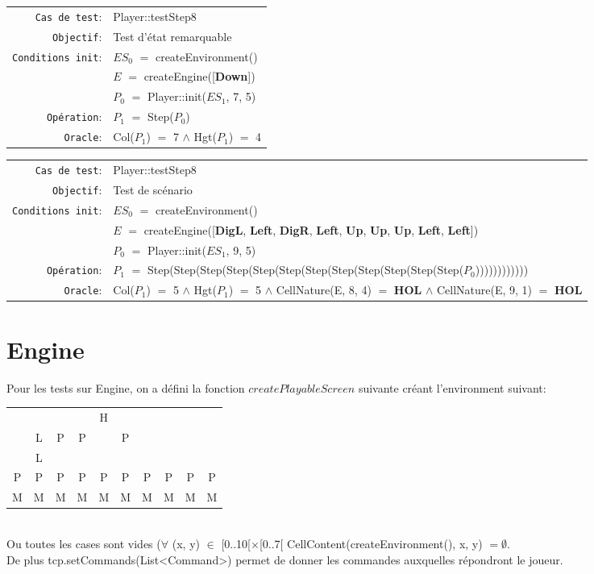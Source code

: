 \documentclass{article}
\begin{document}
{\small
  \begin{longtable}{rl}
    \texttt{Cas de test}: &\textrm{Player::testStep8}\\
    \texttt{Objectif}: & Test d'état remarquable \\
    \texttt{Conditions init}: & $ES_0$ $=$ \textrm{createEnvironment()}\\
    & $E$ $=$ \textrm{createEngine([\textbf{Down}])}\\
    & $P_0$ $=$ \textrm{Player::init($ES_1$, 7, 5)}\\
    \texttt{Opération}: &$P_1$ $=$ \textrm{Step($P_0$)}\\
    \texttt{Oracle}: &\textrm{Col($P_1$)} $=$ 7 $\land$ \textrm{Hgt($P_1$)} $=$ 4\\
  \end{longtable}}

{\small
  \begin{longtable}{rl}
    \texttt{Cas de test}: &\textrm{Player::testStep8}\\
    \texttt{Objectif}: & Test de scénario\\
    \texttt{Conditions init}: & $ES_0$ $=$ \textrm{createEnvironment()}\\
    & $E$ $=$ \textrm{createEngine([\textbf{DigL}, \textbf{Left}, \textbf{DigR}, \textbf{Left}, \textbf{Up}, \textbf{Up}, \textbf{Up}, \textbf{Left}, \textbf{Left}])}\\
    & $P_0$ $=$ \textrm{Player::init($ES_1$, 9, 5)}\\
    \texttt{Opération}: &$P_1$ $=$ \textrm{Step(Step(Step(Step(Step(Step(Step(Step(Step(Step(Step(Step($P_0$))))))))))))}\\
    \texttt{Oracle}: &\textrm{Col($P_1$)} $=$ 5 $\land$ \textrm{Hgt($P_1$)} $=$ 5 $\land$ \textrm{CellNature(E, 8, 4)} $=$ \textbf{HOL} $\land$ \textrm{CellNature(E, 9, 1)} $=$ \textbf{HOL}\\
  \end{longtable}}

\section{Engine}

Pour les tests sur Engine, on a défini la fonction $createPlayableScreen$ suivante créant l'environment suivant:\\
\begin{tabular}{cccccccccc}
   & & & &H& & & & & \\
   &L&P&P& &P& & & & \\
   &L& & & & & & & & \\
  P&P&P&P&P&P&P&P&P&P\\
  M&M&M&M&M&M&M&M&M&M
\end{tabular}\\
\noindent Ou toutes les cases sont vides ($\forall$ (x, y) $\in$ [0..10[$\times$[0..7[ \textrm{CellContent(createEnvironment(), x, y)} $= \emptyset$.\\
De plus \textrm{tcp.setCommands(List<Command>)} permet de donner les commandes auxquelles répondront le joueur.
\end{document}
